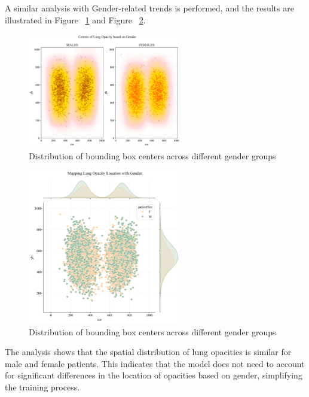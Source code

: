A similar analysis with Gender-related trends is performed, and the results are illustrated in Figure ~\ref{fig:cha-2 figure11} and Figure ~\ref{fig:cha-2 figure12}.

\begin{figure}[H]
    \begin{center}
        \includegraphics[width = 0.6\textwidth]{figures/Figure16.png}
        \caption{Distribution of bounding box centers across different gender groups}
        \label{fig:cha-2 figure11}
    \end{center}
\end{figure}

\begin{figure}[H]
    \begin{center}
        \includegraphics[width = 0.6\textwidth]{figures/Figure17.png}
        \caption{Distribution of bounding box centers across different gender groups}
        \label{fig:cha-2 figure12}
    \end{center}
\end{figure}

The analysis shows that the spatial distribution of lung opacities is similar for male and female patients. This indicates that the model does not need to account for significant differences in the location of opacities based on gender, simplifying the training process.

